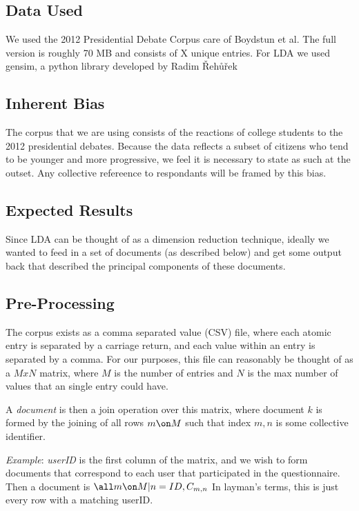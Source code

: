 \subsection{Data Used}
We used the 2012  Presidential Debate Corpus care of Boydstun et al. The full version is roughly 70 MB and consists of X unique entries.
For LDA we used gensim, a python library developed by Radim Řehůřek \cite{gensim}

\subsection{Inherent Bias}
The corpus that we are using consists of the reactions of college students to the 2012 presidential debates. Because the data reflects a subset of citizens who tend to be younger and more progressive, we feel it is necessary to state as such at the outset. Any collective refereence to respondants will be framed by this bias.

\subsection{Expected Results}
Since LDA can be thought of as a dimension reduction technique, ideally we wanted to feed in a set of documents (as described below) and get some output back that described the principal components of these documents.

\subsection{Pre-Processing}
The corpus exists as a comma separated value (CSV) file, where each atomic entry is separated by a carriage return, and each value within an entry is separated by a comma. For our purposes, this file can reasonably be thought of as a $MxN$ matrix, where $M$ is the number of entries and $N$ is the max number of values that an single entry could have.

A \emph{document} is then a join operation over this matrix, where document $k$ is formed by the joining of all rows $m \on M$ such that index $m,n$ is some collective identifier.

\emph{Example}: \emph{userID} is the first column of the matrix, and we wish to form documents that correspond to each user that participated in the questionnaire. Then a document is $\all m \on M | n = ID ,C_{m,n}$ In layman's terms, this is just every row with a matching userID.

